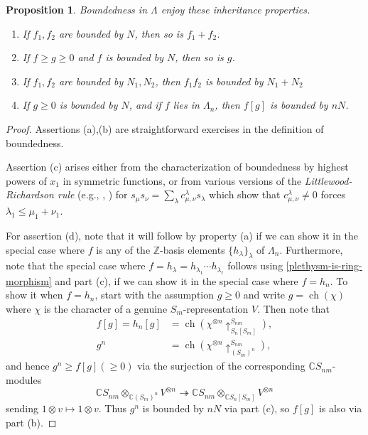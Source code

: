 \documentclass[12pt]{amsart}
\theoremstyle{plain}
\newtheorem{prop}[thm]{Proposition}
\theoremstyle{definition}
\begin{document}
\begin{prop}
\label{boundedness-inheritance-prop}
Boundedness in $\Lambda$
enjoy these inheritance properties.
\begin{enumerate}
\item[(a)]
If $f_1, f_2$ are bounded by $N$, then so is $f_1+f_2$.
\item[(b)]
If $f \geq g \geq 0$ and $f$ is bounded by $N$, then so is $g$.
\item[(c)]
If $f_1, f_2$ are bounded by $N_1,N_2$,  then $f_1f_2$ is bounded by $N_1+N_2$
\item[(d)]
If $g \geq 0$ is bounded by $N$, and if $f$ lies in $\Lambda_n$,
then $f[g]$ is bounded by $nN$.
\end{enumerate}
\end{prop}
\begin{proof}
Assertions (a),(b) are straightforward exercises in the definition of boundedness.

Assertion (c) arises either from the characterization of boundedness by
highest powers of $x_1$ in symmetric functions, or from various versions of 
the {\it Littlewood-Richardson rule} (e.g., \cite[\S I.9]{Macdonald}, \cite[Thm. A1.3.3]{Stanley}) for
$s_\mu s_\nu = \sum_{\lambda} c^{\lambda}_{\mu,\nu} s_\lambda$
which show that $c^{\lambda}_{\mu,\nu} \neq 0$ forces
$\lambda_1 \leq \mu_1+\nu_1$.

For assertion (d), note that it will follow by property (a) if we can
show it in the special case where $f$ is any of the ${{\mathbb{Z}}}$-basis elements 
$\{ h_\lambda\}_{\lambda}$ of $\Lambda_n$.
Furthermore, note that the special case where $f=h_\lambda = h_{\lambda_1} \cdots h_{\lambda_\ell}$ follows using \eqref{plethysm-is-ring-morphism} and part (c), if we can show it in the special case where $f=h_n$.
To show it when $f=h_n$, start with the assumption
$g \geq 0$ and write $g={{\operatorname{ch}}}(\chi)$ where $\chi$ is
the character of a genuine $S_m$-representation $V$.  Then note that 
$$
\begin{aligned}
f[g]=h_n[g]&={{\operatorname{ch}}} \left(
\chi^{\otimes n} \uparrow_{S_n[S_m]}^{S_{nm}}
\right), \\
g^n&={{\operatorname{ch}}} \left(
\chi^{\otimes n} \uparrow_{(S_m)^n}^{S_{nm}}
\right),
\end{aligned}
$$
and hence $g^n \geq f[g] (\geq 0)$ via the
surjection of the corresponding ${{\mathbb C}} S_{nm}$-modules
$$
{{\mathbb C}} S_{nm} \otimes_{{{\mathbb C}} (S_m)^n } V^{\otimes n}
\twoheadrightarrow
{{\mathbb C}} S_{nm} \otimes_{{{\mathbb C}} S_n[S_m]} V^{\otimes n}
$$
sending $1 \otimes v \mapsto 1 \otimes v$.  Thus
$g^n$ is bounded by $nN$ via part (c), so $f[g]$ is also via part (b).
\end{proof}
\end{document}
